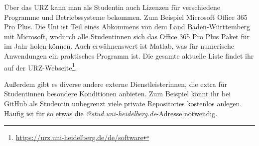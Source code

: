 Über das URZ kann man als Studentin auch Lizenzen für verschiedene Programme und Betriebssysteme bekommen. Zum Beispiel Microsoft Office 365 Pro Plus. Die Uni ist Teil eines Abkommens von dem Land Baden-Württemberg mit Microsoft, wodurch alle Studentinnen sich das Office 365 Pro Plus Paket für  im Jahr holen können. Auch erwähnenswert ist Matlab, was für numerische Anwendungen ein praktisches Programm ist. Die gesamte aktuelle Liste findet ihr auf der URZ-Webseite\footnote{\url{https://urz.uni-heidelberg.de/de/software}}.

Außerdem gibt es diverse andere externe Dienstleisterinnen, die extra für Studentinnen besondere Konditionen anbieten. Zum Beispiel könnt ihr bei GitHub als Studentin unbegrenzt viele private Repositories kostenlos anlegen. Häufig ist für so etwas die \emph{@stud.uni-heidelberg.de}-Adresse notwendig.
